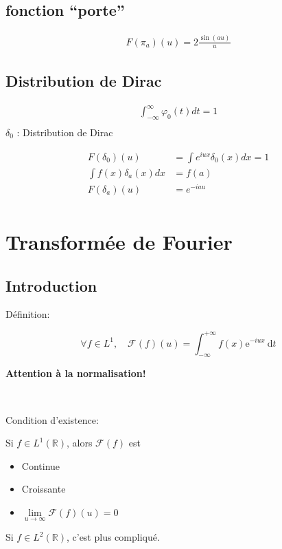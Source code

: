 \documentclass[a4paper,11pt]{article}
\begin{document}
\subsection{fonction ``porte''}

\begin{align*}
  F(\pi_a)(u) = 2 \frac{\sin(au)}{u}
\end{align*}

\subsection{Distribution de Dirac}
\begin{align*}
  \int_{-\infty}^{\infty} \varphi_0(t)dt = 1\\
 \end{align*}
$\delta_0 $ : Distribution de Dirac

\begin{align*}
  F(\delta_0)(u) &= \int e^{iux} \delta_0(x)dx = 1\\
  \int f(x)\delta_a(x)dx &= f(a)\\
  F(\delta_a)(u) &= e^{-iau}\\
\end{align*}

\section{Transformée de Fourier}

\subsection{Introduction}

Définition:

$$ \forall f \in L^{1}, \quad \mathcal{F}(f)(u) = \int^{+\infty}_{-\infty} f(x) \mathrm{e}^{-iux} \: \mathrm{d} t $$

\textbf{Attention à la normalisation!}

\

Condition d'existence:

Si $ f \in L^1(\mathbb{R}) $, alors $\mathcal{F}(f)$ est

\begin{itemize}
\item Continue
\item Croissante
\item $ \underset{u \to \infty}{\lim} \mathcal{F}(f)(u) = 0 $
\end{itemize}

Si $f \in L^2(\mathbb{R})$, c'est plus compliqué.
\end{document}
